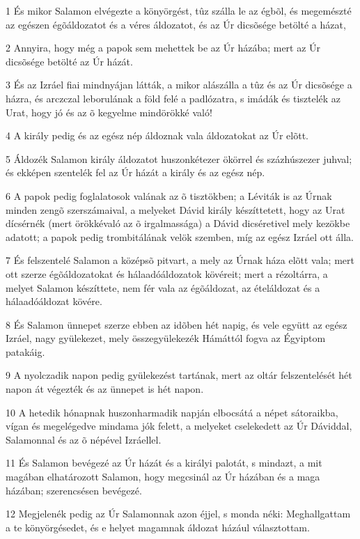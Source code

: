 \par 1 És mikor Salamon elvégezte a könyörgést, tûz szálla le az égbõl, és megemészté az egészen égõáldozatot és a véres áldozatot, és az Úr dicsõsége betölté a házat,
\par 2 Annyira, hogy még a papok sem mehettek be az Úr házába; mert az Úr dicsõsége betölté az Úr házát.
\par 3 És az Izráel fiai mindnyájan látták, a mikor alászálla a tûz és az Úr dicsõsége a házra, és arczczal leborulának a föld felé a padlózatra, s imádák és tisztelék az Urat, hogy jó és az õ kegyelme mindörökké való!
\par 4 A király pedig és az egész nép áldoznak vala áldozatokat az Úr elõtt.
\par 5 Áldozék Salamon király áldozatot huszonkétezer ökörrel és százhúszezer juhval; és ekképen szentelék fel az Úr házát a király és az egész nép.
\par 6 A papok pedig foglalatosok valának az õ tisztökben; a Léviták is az Úrnak minden zengõ szerszámaival, a melyeket Dávid király készíttetett, hogy az Urat dícsérnék (mert örökkévaló  az õ irgalmassága) a Dávid dicséretivel mely kezökbe adatott; a papok pedig trombitálának velök szemben, míg az egész Izráel ott álla.
\par 7 És felszentelé Salamon a középsõ pitvart, a mely az Úrnak háza elõtt vala; mert ott szerze égõáldozatokat és hálaadóáldozatok kövéreit; mert a rézoltárra, a melyet Salamon készíttete, nem fér vala az égõáldozat, az ételáldozat és a hálaadóáldozat kövére.
\par 8 És Salamon ünnepet szerze ebben az idõben hét napig, és vele együtt az egész Izráel, nagy gyülekezet, mely összegyülekezék Hámáttól fogva az Égyiptom patakáig.
\par 9 A nyolczadik napon pedig gyülekezést tartának, mert az oltár felszentelését hét napon át végezték és az ünnepet is hét napon.
\par 10 A hetedik hónapnak huszonharmadik napján elbocsátá a népet sátoraikba, vígan és megelégedve mindama jók felett, a melyeket cselekedett az Úr Dáviddal, Salamonnal és az õ népével Izráellel.
\par 11 És Salamon bevégezé az Úr házát és a királyi palotát, s mindazt, a mit magában elhatározott Salamon, hogy megcsinál az Úr házában és a maga házában; szerencsésen  bevégezé.
\par 12 Megjelenék pedig az Úr Salamonnak azon éjjel, s monda néki: Meghallgattam a te könyörgésedet, és e  helyet magamnak áldozat házául választottam.
